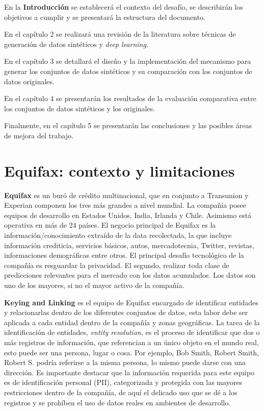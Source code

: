 En la \textbf{Introducción} se establecerá el contexto del desafío, se describirán los objetivos a cumplir y se presentará la estructura del documento.

En el capítulo 2 se realizará una revisión de la literatura sobre técnicas de generación de datos sintéticos y \emph{deep learning}.

En el capítulo 3 se detallará el diseño y la implementación del mecanismo para generar los conjuntos de datos sintéticos y su comparación con los conjuntos de datos originales.

En el capítulo 4 se presentarán los resultados de la evaluación comparativa entre los conjuntos de datos sintéticos y los originales.

Finalmente, en el capítulo 5 se presentarán las conclusiones y las posibles áreas de mejora del trabajo.

\section{Equifax: contexto y limitaciones}

\textbf{Equifax} es un buró de crédito multinacional, que en conjunto a Transunion y Experian componen los tres más grandes a nivel mundial. La compañía posee equipos de desarrollo en Estados Unidos, India, Irlanda y Chile. Asimismo está operativa en más de 24 países. El negocio principal de Equifax es la información/conocimiento extraído de la data recolectada, la que incluye información crediticia, servicios básicos, autos, mercadotecnia, Twitter, revistas, informaciones demográficas entre otros. El principal desafío tecnológico de la compañía es resguardar la privacidad. El segundo, realizar toda clase de predicciones relevantes para el mercado con los datos acumulados. Los datos son uno de los mayores, si no el mayor activo de la compañía.

\textbf{Keying and Linking} es el equipo de Equifax encargado de identificar entidades y relacionarlas dentro de los diferentes conjuntos de datos, esta labor debe ser aplicada a cada entidad dentro de la compañía y zonas geográficas. La tarea de la identificación de entidades, \emph{entity resolution}, es el proceso de identificar que dos o más registros de información, que referencian a un único objeto en el mundo real, esto puede ser una persona, lugar o cosa. Por ejemplo, Bob Smith, Robert Smith, Robert S. podría referirse a la misma persona, lo mismo puede darse con una dirección. Es importante destacar que la información requerida para este equipo es de identificación personal (PII), categorizada y protegida con las mayores restricciones dentro de la compañía, de aquí el delicado uso que se dé a los registros y se prohíben el uso de datos reales en ambientes de desarrollo. 

